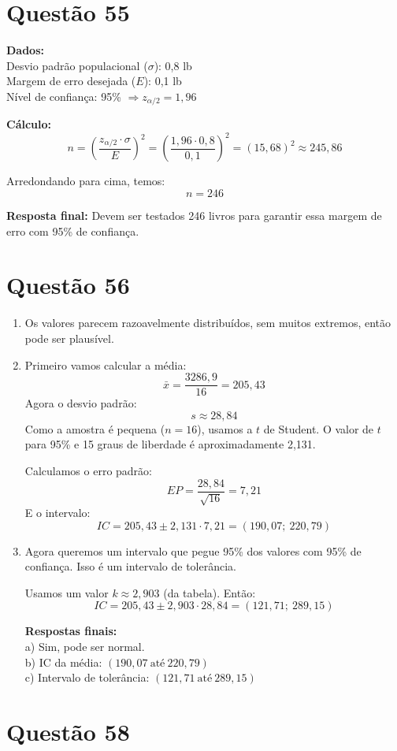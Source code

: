 \documentclass[12pt]{article}
\newcommand{\quest}[1]{\section*{Questão #1}} %
\begin{document}
\quest{55}

\textbf{Dados:}\\
Desvio padrão populacional ($\sigma$): 0,8 lb\\
Margem de erro desejada ($E$): 0,1 lb\\
Nível de confiança: 95\% $\Rightarrow z_{\alpha/2} = 1{,}96$

\textbf{Cálculo:}
\[
    n = \left( \frac{z_{\alpha/2} \cdot \sigma}{E} \right)^2 = \left( \frac{1{,}96 \cdot 0{,}8}{0{,}1} \right)^2 = (15{,}68)^2 \approx 245{,}86
\]

Arredondando para cima, temos:
\[
    \boxed{n = 246}
\]

\textbf{Resposta final:} Devem ser testados 246 livros para garantir essa margem de erro com 95\% de confiança.


\quest{56}

\begin{enumerate}
    \item Os valores parecem razoavelmente distribuídos, sem muitos extremos, então pode ser plausível.

    \item Primeiro vamos calcular a média:
    \[ 
    \bar{x} = \frac{3286{,}9}{16} = 205{,}43
    \]
    Agora o desvio padrão:
    \[ 
    s \approx 28{,}84
    \]
    Como a amostra é pequena ($n=16$), usamos a $t$ de Student. O valor de $t$ para 95\% e 15 graus de liberdade é aproximadamente 2{,}131.

    Calculamos o erro padrão:
    \[ 
    EP = \frac{28{,}84}{\sqrt{16}} = 7{,}21
    \]
    E o intervalo:
    \[ 
    IC = 205{,}43 \pm 2{,}131 \cdot 7{,}21 = (190{,}07;\ 220{,}79)
    \]

    \item Agora queremos um intervalo que pegue 95\% dos valores com 95\% de confiança. Isso é um intervalo de tolerância.

    Usamos um valor $k \approx 2{,}903$ (da tabela). Então:
    \[ 
    IC = 205{,}43 \pm 2{,}903 \cdot 28{,}84 = (121{,}71;\ 289{,}15)
    \]

    \textbf{Respostas finais:}\\
    a) Sim, pode ser normal.\\
    b) IC da média: $\boxed{(190{,}07\ \text{até}\ 220{,}79)}$\\
    c) Intervalo de tolerância: $\boxed{(121{,}71\ \text{até}\ 289{,}15)}$
\end{enumerate}

\quest{58}
\end{document}

